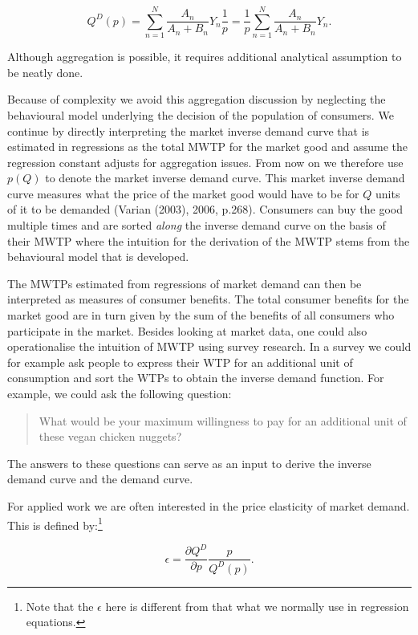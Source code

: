 \documentclass[
]{book}
\begin{document}
\begin{equation}
Q^D(p) = \sum_{n= 1}^{N}\frac{A_n}{A_n+B_n} Y_n \frac{1}{p}=\frac{1}{p} \sum_{n= 1}^{N}\frac{A_n}{A_n+B_n} Y_n.
\end{equation}

Although aggregation is possible, it requires additional analytical assumption to be neatly done.

Because of complexity we avoid this aggregation discussion by neglecting the behavioural model underlying the decision of the population of consumers. We continue by directly interpreting the market inverse demand curve that is estimated in regressions as the total MWTP for the market good and assume the regression constant adjusts for aggregation issues. From now on we therefore use \(p(Q)\) to denote the market inverse demand curve. This market inverse demand curve measures what the price of the market good would have to be for \(Q\) units of it to be demanded (Varian (2003), 2006, p.268). Consumers can buy the good multiple times and are sorted \emph{along} the inverse demand curve on the basis of their MWTP where the intuition for the derivation of the MWTP stems from the behavioural model that is developed.

The MWTPs estimated from regressions of market demand can then be interpreted as measures of consumer benefits. The total consumer benefits for the market good are in turn given by the sum of the benefits of all consumers who participate in the market. Besides looking at market data, one could also operationalise the intuition of MWTP using survey research. In a survey we could for example ask people to express their WTP for an additional unit of consumption and sort the WTPs to obtain the inverse demand function. For example, we could ask the following question:

\begin{quote}
What would be your maximum willingness to pay for an additional unit of these vegan chicken nuggets?
\end{quote}

The answers to these questions can serve as an input to derive the inverse demand curve and the demand curve.

For applied work we are often interested in the price elasticity of market demand. This is defined by:\footnote{Note that the \(\epsilon\) here is different from that what we normally use in regression equations.}

\begin{equation}
\epsilon = \frac{\partial Q^D}{\partial p} \frac{p}{Q^D(p)}.
\end{equation}
\end{document}

